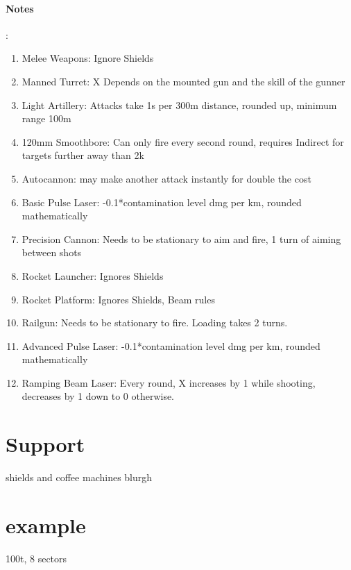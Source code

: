 \paragraph{Notes}:
\begin{enumerate}[label = - ]
\item Melee Weapons: Ignore Shields\\
\item Manned Turret: X Depends on the mounted gun and the skill of the gunner\\
\item Light Artillery: Attacks take 1s per 300m distance, rounded up, minimum range 100m\\
\item 120mm Smoothbore: Can only fire every second round, requires Indirect for targets further away than 2k\\
\item Autocannon: may make another attack instantly for double the cost\\
\item Basic Pulse Laser: -0.1*contamination level dmg per km, rounded mathematically \\
\item Precision Cannon: Needs to be stationary to aim and fire, 1 turn of aiming between shots \\
\item Rocket Launcher: Ignores Shields \\
\item Rocket Platform: Ignores Shields, Beam rules \\
\item Railgun: Needs to be stationary to fire.
Loading takes 2 turns.\\
\item Advanced Pulse Laser: -0.1*contamination level dmg per km, rounded mathematically \\
\item Ramping Beam Laser: Every round, X increases by 1 while shooting, decreases by 1 down to 0 otherwise.\\
\end{enumerate}

\section{Support}\label{sec:support}
shields and coffee machines blurgh

\section{example}\label{sec:example}
100t, 8 sectors

